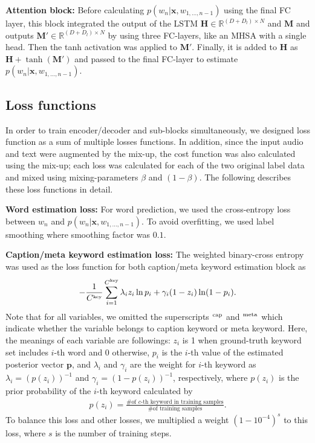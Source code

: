 \documentclass{article}
\begin{document}
\begin{sloppy}
\vspace{3pt}
\noindent
{\bf Attention block:} Before calculating $p( w_n | \bm{x}, w_{1,..., n-1} )$ using the final FC layer, this block integrated the output of the LSTM $\bm{H} \in \mathbb{R}^{ (D+D_l) \times N}$ and $\bm{M}$ and outputs $\bm{M}' \in \mathbb{R}^{ (D+D_l) \times N}$ by using three FC-layers, like an MHSA with a single head.
Then the tanh activation was applied to $\bm{M}'$.
Finally, it is added to $\bm{H}$ as $\bm{H} + \tanh( \bm{M}' ) $ and passed to the final FC-layer to estimate $p( w_n | \bm{x}, w_{1,..., n-1} )$.

\subsection{Loss functions}

In order to train encoder/decoder and sub-blocks simultaneously, we designed loss function as a sum of multiple losses functions.
In addition, since the input audio and text were augmented by the mix-up, the cost function was also calculated using the mix-up; each loss was calculated for each of the two original label data and mixed using mixing-parameters $\beta$ and $(1 - \beta)$.
The following describes these loss functions in detail.


\vspace{3pt}
\noindent
{\bf Word estimation loss:} For word prediction, we used the cross-entropy loss between $w_n$ and $p( w_n | \bm{x}, w_{1,..., n-1} )$. To avoid overfitting, we used label smoothing where smoothing factor was $0.1$.

\vspace{3pt}
\noindent
{\bf Caption/meta keyword estimation loss:}
The weighted binary-cross entropy was used as the loss function for both caption/meta keyword estimation block as
\begin{align}
- \frac{1}{C^{\mbox{\tiny key}}} \sum_{i=1}^{C^{\mbox{\tiny key}}} 
\lambda_i z_i \ln p_i
+
\gamma_i (1-z_i) \ln (1 - p_i).
\end{align}
Note that for all variables, we omitted the superscripts ${}^{\mbox{\scriptsize cap}}$ and ${}^{\mbox{\scriptsize meta}}$ which indicate whether the variable belongs to caption keyword or meta keyword.
Here, the meanings of each variable are followings: 
$z_i$ is 1 when ground-truth keyword set includes $i$-th word and 0 otherwise, 
$p_i$ is the $i$-th value of the estimated posterior vector $\bm{p}$, and
$\lambda_i$ and $\gamma_i$ are the weight for $i$-th keyword as $\lambda_i = ( p(z_i) )^{-1}$ and $\gamma_i = ( 1 - p(z_i) )^{-1}$, respectively, where $p(z_i)$ is the prior probability of the $i$-th keyword calculated by
\begin{align}
p(z_i) = \frac{\mbox{\# of $c$-th keyword in training samples}}{ \mbox{\# of training samples} }.
\end{align}
To balance this loss and other losses, we multiplied a weight $(1-10^{-4})^{s}$ to this loss, where $s$ is the number of training steps.



\end{sloppy}
\end{document}
